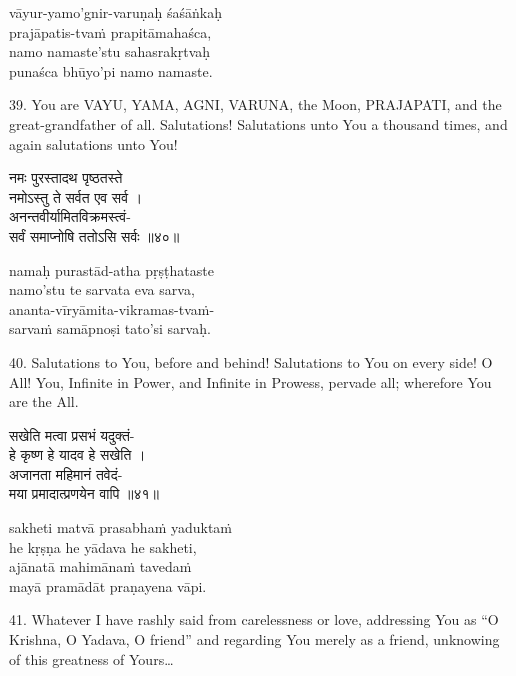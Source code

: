 \begin{transliteration}
vāyur-yamo'gnir-varuṇaḥ śaśāṅkaḥ \\
\tab prajāpatis-tvaṁ prapitāmahaśca, \\
namo namaste'stu sahasrakṛtvaḥ \\
\tab punaśca bhūyo'pi namo namaste.
\end{transliteration}

39. You are VAYU, YAMA, AGNI, VARUNA, the Moon, PRAJAPATI, and the
great-grandfather of all. Salutations! Salutations unto You a thousand times,
and again salutations unto You!

\begin{gitaverse}
नमः पुरस्तादथ पृष्ठतस्ते \\
\tab नमोऽस्तु ते सर्वत एव सर्व । \\
अनन्तवीर्यामितविक्रमस्त्वं- \\
\tab सर्वं समाप्नोषि ततोऽसि सर्वः ॥४०॥
\end{gitaverse}

\begin{transliteration}
namaḥ purastād-atha pṛṣṭhataste \\
\tab namo'stu te sarvata eva sarva, \\
ananta-vīryāmita-vikramas-tvaṁ- \\
\tab sarvaṁ samāpnoṣi tato'si sarvaḥ.
\end{transliteration}

40. Salutations to You, before and behind! Salutations to You on every side! O
All! You, Infinite in Power, and Infinite in Prowess, pervade all; wherefore
You are the All.

\begin{gitaverse}
सखेति मत्वा प्रसभं यदुक्तं- \\
\tab हे कृष्ण हे यादव हे सखेति । \\
अजानता महिमानं तवेदं- \\
\tab मया प्रमादात्प्रणयेन वापि ॥४१॥
\end{gitaverse}

\begin{transliteration}
sakheti matvā prasabhaṁ yaduktaṁ \\
\tab he kṛṣṇa he yādava he sakheti, \\
ajānatā mahimānaṁ tavedaṁ \\
\tab mayā pramādāt praṇayena vāpi.
\end{transliteration}

41. Whatever I have rashly said from carelessness or love, addressing You as
``O Krishna, O Yadava, O friend'' and regarding You merely as a friend,
unknowing of this greatness of Yours\ldots

